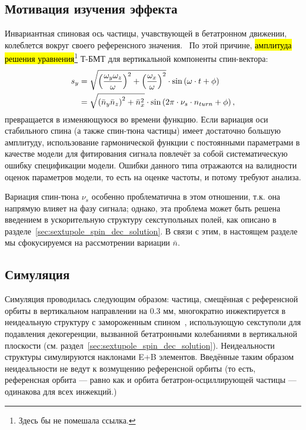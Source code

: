 
\subsection{Мотивация изучения эффекта}
Инвариантная спиновая ось частицы, учавствующей в бетатронном движении, колеблется вокруг своего референсного значения.~\cite[стр.~11]{Shatunov} По этой причине, \hl{амплитуда решения уравнения}\footnote{Здесь бы не помешала ссылка.} Т-БМТ для вертикальной компоненты спин-вектора:
\begin{align}
s_y &= \sqrt{\bkt{\frac{\w_y\w_z}{\w}}^2 + \bkt{\frac{\w_x}{\w}}^2}\cdot\sin\bkt{\w\cdot t + \phi}\notag\\
&= \sqrt{\bkt{\bar n_y\bar n_z}^2 + \bar n_x^2} \cdot \sin\bkt{2\pi\cdot\nu_s\cdot n_{turn} + \phi},\label{eq:sy_varying_amplitude}
\end{align}
превращается в изменяющуюся во времени функцию. Если вариация оси стабильного спина (а также спин-тюна частицы) имеет достаточно большую амплитуду, использование гармонической функции с постоянными параметрами в качестве модели для фитирования сигнала повлечёт за собой систематическую ошибку спецификации модели. Ошибки данного типа отражаются на валидности оценок параметров модели, то есть на оценке частоты, и потому требуют анализа.

Вариация спин-тюна $\nu_s$ особенно проблематична в этом отношении, т.к. она напрямую влияет на фазу сигнала; однако, эта проблема может быть решена введением в ускорительную структуру секступольных полей, как описано в разделе~\ref{sec:sextupole_spin_dec_solution}. В связи с этим, в настоящем разделе мы сфокусируемся на рассмотрении вариации $\bar n$.

\subsection{Симуляция}
Симуляция проводилась следующим образом: частица, смещённая с референсной орбиты в вертикальном направлении
на 0.3 мм, многократно инжектируется в неидеальную структуру с замороженным спином~\cite{Senichev:Lattices},
использующую секступоли для подавления декогеренции, вызванной бетатронными колебаниями
в вертикальной плоскости (см. раздел~\ref{sec:sextupole_spin_dec_solution}).
Неидеальности структуры симулируются наклонами E+B элементов.
Введённые таким образом неидеальности не ведут к возмущению референсной орбиты (то есть,
референсная орбита --- равно как и орбита бетатрон-осциллирующей частицы --- одинакова для всех инжекций.)

